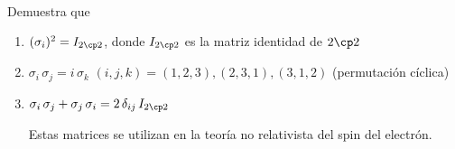 \begin{enumerate}
\begin{align*}
\end{align*}
Demuestra que
\begin{enumerate}
\item $(\sigma_{i})^{2} = I_{2 \cp 2}$, donde $I_{2 \cp 2}$ es la matriz identidad de $2 \cp 2$
\item $\sigma_{i} \, \sigma_{j} =  i \, \sigma_{k}$ $(i, j, k) = (1, 2, 3), (2, 3, 1), (3, 1, 2)$ (permutación cíclica)
\item $\sigma_{i} \, \sigma_{j} + \sigma_{j} \, \sigma_{i} = 2 \, \delta_{ij} \, I_{2 \cp 2}$

Estas matrices se utilizan en la teoría no relativista del spin del electrón.
\end{enumerate}
\end{enumerate}
